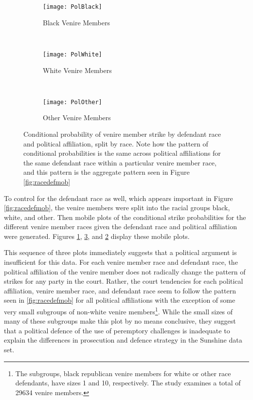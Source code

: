 \begin{figure}[h!]
  \centering
  \begin{subfigure}{0.4\textwidth}
    \texttt{[image: PolBlack]}
    \caption{\footnotesize Black Venire Members}
    \label{fig:blackdefpol}
  \end{subfigure}
  ~
  \begin{subfigure}{0.4\textwidth}
    \texttt{[image: PolWhite]}
    \caption{\footnotesize White Venire Members}
    \label{fig:whitedefpol}
  \end{subfigure}
  ~
  \begin{subfigure}{0.4\textwidth}
    \texttt{[image: PolOther]}
    \caption{\footnotesize Other Venire Members}
    \label{fig:otherdefpol}
  \end{subfigure}
  \caption[Strikes by Political Affiliation, Race, and Defendant Race (Sunshine)]
  {\footnotesize Conditional probability of venire member strike by defendant race and political affiliation, split by race. Note how the
    pattern of conditional probabilities is the same across political affiliations for the same defendant race within a particular
    venire member race, and this pattern is the aggregate pattern seen in Figure \ref{fig:racedefmob}} \label{fig:racedefpol}
\end{figure}

To control for the defendant race as well, which appears important in
Figure \ref{fig:racedefmob}, the venire members were split into the racial groups black, white, and other. Then mobile plots of the conditional strike probabilities for the different venire member
races given the defendant race and political affiliation were generated. Figures \ref{fig:blackdefpol}, \ref{fig:otherdefpol}, and
\ref{fig:whitedefpol} display these mobile plots. 

This sequence of three plots immediately suggests that a political argument is insufficient for this data. For each venire member
race and defendant race, the political affiliation of the venire member does not radically change the pattern of strikes for any
party in the court. Rather, the court tendencies for each political affiliation, venire member race, and defendant race seem to
follow the pattern seen in \ref{fig:racedefmob} for all political affiliations with the exception of some very small subgroups of
non-white venire members\footnote{The subgroups, black republican venire members for white or other race defendants, have sizes 1 and
  10, respectively. The study examines a total of 29634 venire
  members.}. While the small sizes of many of these subgroups make this plot by no means conclusive, they suggest that a political defence of the use of peremptory challenges is inadequate to explain the differences in prosecution and defence strategy in the Sunshine data set.

